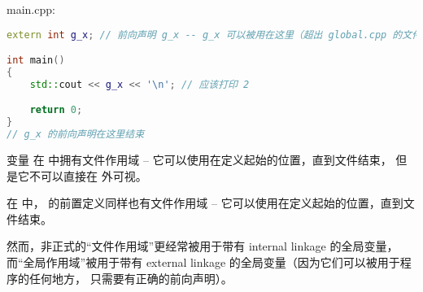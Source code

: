 \documentclass[../../LearnCpp.tex]{subfiles}
\begin{document}
main.cpp:

\begin{lstlisting}[language=C++]
extern int g_x; // 前向声明 g_x -- g_x 可以被用在这里（超出 global.cpp 的文件作用域）

int main()
{
    std::cout << g_x << '\n'; // 应该打印 2

    return 0;
}
// g_x 的前向声明在这里结束
\end{lstlisting}

变量  在  中拥有文件作用域 -- 它可以使用在定义起始的位置，直到文件结束，
但是它不可以直接在  外可视。

在  中， 的前置定义同样也有文件作用域 -- 它可以使用在定义起始的位置，直到文件结束。

然而，非正式的“文件作用域”更经常被用于带有 internal linkage 的全局变量，
而“全局作用域”被用于带有 external linkage 的全局变量（因为它们可以被用于程序的任何地方，
只需要有正确的前向声明）。
\end{document}
